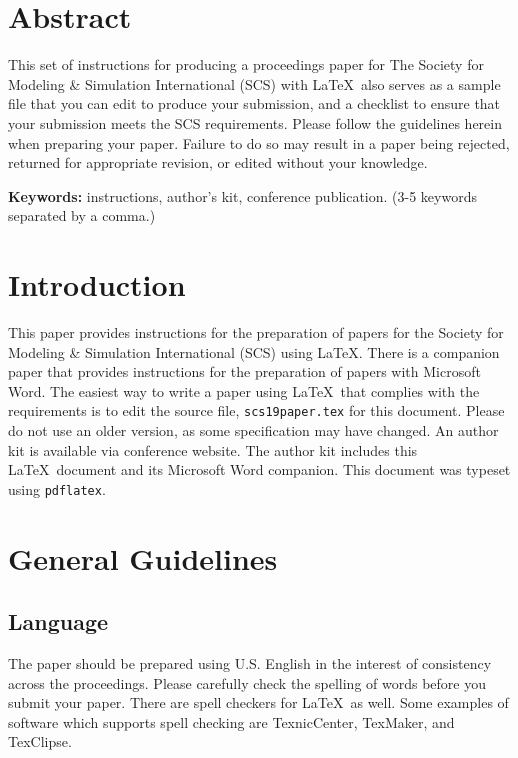 \documentclass{scspaperproc}
\theoremstyle{scsthe}
\begin{document}
\section*{Abstract}

This set of instructions for producing a proceedings paper for The Society for Modeling \& Simulation International (SCS) with \LaTeX\ also serves as a sample file that you can edit to produce your submission, and a checklist to ensure that your submission meets the SCS requirements. Please follow the guidelines herein when preparing your paper. Failure to do so may result in a paper being rejected, returned for appropriate revision, or edited without your knowledge.

\textbf{Keywords:} instructions, author’s kit, conference publication. (3-5 keywords separated by a comma.)

\section{Introduction}
\label{sec:intro}

This paper provides instructions for the preparation of papers for the Society for Modeling \& Simulation International (SCS) using \LaTeX. There is a companion paper that provides instructions for the preparation of papers with Microsoft Word. The easiest way to write a paper using \LaTeX\ that complies with the requirements is to edit the source file, \texttt{scs19paper.tex} for this document. Please do not use an older version, as some specification may have changed. An author kit is available via conference website. The author kit includes this \LaTeX\ document and its Microsoft Word companion. This document was typeset using \texttt{pdflatex}.


\section{General Guidelines}

\subsection{Language}

The paper should be prepared using U.S. English in the interest of consistency across the proceedings. Please carefully check the spelling of words before you submit your paper. There are spell checkers for \LaTeX\ as well.
Some examples of software which supports spell checking are TexnicCenter, TexMaker, and TexClipse.
\end{document}

